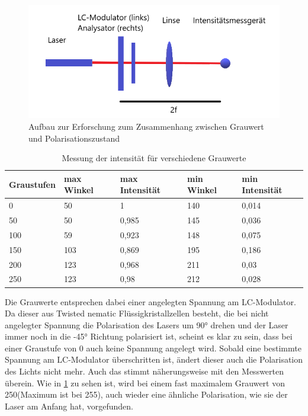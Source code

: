 \begin{figure}[h!]
	\centering
	\includegraphics[scale=1]{4.1.4-Aufbau.png}
	\caption{Aufbau zur Erforschung zum Zusammenhang zwischen Grauwert und Polarisationszustand}
	\label{414}
\end{figure}

\begin{table}[]
	\caption{Messung der intensität für verschiedene Grauwerte }
	\label{tab:grauwert}
	\begin{tabular}{l|llll}
		Graustufen & max Winkel & max Intensität & min Winkel & min Intensität \\ \hline
		0          & 50         & 1              & 140        & 0,014          \\
		50         & 50         & 0,985          & 145        & 0,036          \\
		100        & 59         & 0,923          & 148        & 0,075          \\
		150        & 103        & 0,869          & 195        & 0,186          \\
		200        & 123        & 0,968          & 211        & 0,03           \\
		250        & 123        & 0,98           & 212        & 0,028         
	\end{tabular}
\end{table}



Die Grauwerte entsprechen dabei einer angelegten Spannung am LC-Modulator. Da dieser aus Twisted nematic Flüssigkristallzellen besteht, die bei nicht angelegter Spannung die Polarisation des Lasers um 90° drehen und der Laser immer noch in die -45° Richtung polarisiert ist, scheint es klar zu sein, dass bei einer Graustufe von 0 auch keine Spannung angelegt wird. Sobald eine bestimmte Spannung am LC-Modulator überschritten ist, ändert dieser auch die Polarisation des Lichts nicht mehr. Auch das stimmt näherungsweise mit den Messwerten überein. Wie in \cref{tab:grauwert} zu sehen ist, wird bei einem fast maximalem Grauwert von 250(Maximum ist bei 255), auch wieder eine ähnliche Polarisation, wie sie der Laser am Anfang hat, vorgefunden. 

